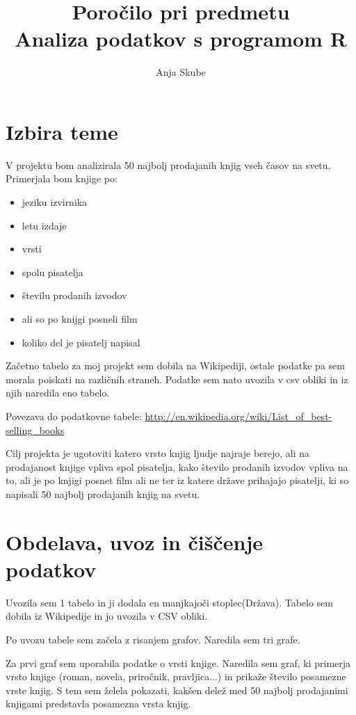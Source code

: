 \documentclass[11pt,a4paper]{article}
\begin{document}
\title{Poročilo pri predmetu \\
Analiza podatkov s programom R}
\author{Anja Skube}
\maketitle

\section{Izbira teme}

V projektu bom analizirala 50 najbolj prodajanih knjig vseh časov na svetu. Primerjala bom knjige po:

\begin{itemize}
\item jeziku izvirnika
\item letu izdaje
\item vrsti
\item spolu pisatelja
\item številu prodanih izvodov
\item ali so po knijgi posneli film
\item koliko del je pisatelj napisal
\end{itemize}

Začetno tabelo za moj projekt sem dobila na Wikipediji, ostale podatke pa sem morala poiskati na različnih straneh. Podatke sem nato uvozila v csv obliki in iz njih naredila eno tabelo. 

Povezava do podatkovne tabele:
\url{http://en.wikipedia.org/wiki/List_of_best-selling_books}

Cilj projekta je ugotoviti katero vrsto knjig ljudje najraje berejo, ali na prodajanost knjige vpliva spol pisatelja, kako število prodanih izvodov vpliva na to, ali je po knjigi posnet film ali ne ter iz katere države prihajajo pisatelji, ki so napisali 50 najbolj prodajanih knjig na svetu. 



\section{Obdelava, uvoz in čiščenje podatkov}
Uvozila sem 1 tabelo in ji dodala en manjkajoči stoplec(Država). Tabelo sem dobila iz Wikipedije in jo uvozila v CSV obliki.

Po uvozu tabele sem začela z risanjem grafov. Naredila sem tri grafe. 

Za prvi graf sem uporabila podatke o vrsti knjige. Naredila sem graf, ki primerja vrsto knjige (roman, novela, priročnik, pravljica...) in prikaže število posamezne vrste knjig. S tem sem želela pokazati, kakšen delež med 50 najbolj prodajanimi knjigami predstavla posamezna vrsta knjig.
\end{document}
